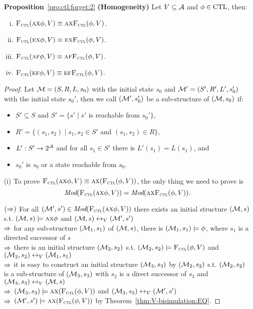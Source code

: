 \documentclass[twoside,11pt]{article}
\begin{document}
	
	\textbf{Proposition}~\ref{pro:ctl:forget:2} \textbf{(Homogeneity)}
	Let $V\subseteq\cal A$ and $\phi \in \textrm{CTL}$, then:%
	\begin{enumerate}[(i)]
		\item ${\textsc{F}_{\textsc{ctl}}}(\textsc{a}\textsc{x}\phi,V)\equiv \textsc{a}\textsc{x} {\textsc{F}_{\textsc{ctl}}}(\phi,V)$.
		\item ${\textsc{F}_{\textsc{ctl}}}(\textsc{e}\textsc{x}\phi,V)\equiv\textsc{e}\textsc{x} {\textsc{F}_{\textsc{ctl}}}(\phi,V)$.
		\item ${\textsc{F}_{\textsc{ctl}}}(\textsc{a} \textsc{f}\phi,V)\equiv \textsc{a} \textsc{f} {\textsc{F}_{\textsc{ctl}}}(\phi,V)$.
		\item ${\textsc{F}_{\textsc{ctl}}}(\textsc{e}\textsc{f}\phi,V)\equiv\textsc{e}\textsc{f} {\textsc{F}_{\textsc{ctl}}}(\phi,V)$.
	\end{enumerate}
	\begin{proof}
		Let ${\cal M}=(S, R, L,s_0)$ with the initial state $s_0$ and ${\cal M}'=(S', R', L',s_0')$ with the initial state $s_0'$, then we call $({\cal M}', s_0')$ be a sub-structure of $({\cal M},s_0)$ if:
		\begin{itemize}
			\item $S' \subseteq S$ and $S'=\{s' \mid s'$ is reachable from $s_0'\}$,
			\item $R' =\{(s_1, s_2)\mid s_1, s_2 \in S'$ and $(s_1, s_2) \in R\}$,
			\item $L': S' \rightarrow 2^{\cal A}$ and for all $s_1 \in S'$ there is $L'(s_1) = L(s_1)$, and
			\item $s_0'$ is $s_0$ or a state reachable from $s_0$.
		\end{itemize}
		
		(i) To prove ${\textsc{F}_{\textsc{ctl}}}(\textsc{a} \textsc{x} \phi, V) \equiv \textsc{a} \textsc{x}({\textsc{F}_{\textsc{ctl}}}(\phi, V))$, the only thing we need to prove is \[\textit{Mod}({\textsc{F}_{\textsc{ctl}}}(\textsc{a} \textsc{x} \phi, V)) = \textit{Mod}( \textsc{a}\textsc{x}{\textsc{F}_{\textsc{ctl}}}(\phi, V)).\]
		
		$(\Rightarrow)$ For all $({\cal M}', s') \in \textit{Mod}({\textsc{F}_{\textsc{ctl}}}(\textsc{a} \textsc{x} \phi, V))$ there exists an initial structure $({\cal M}, s)$ s.t. $({\cal M}, s)\models \textsc{a} \textsc{x} \phi$ and $({\cal M}, s) \leftrightarrow_V ({\cal M}',s')$\\
		$\Rightarrow$ for any sub-structure $({\cal M}_1, s_1)$ of $({\cal M}, s)$, there is $({\cal M}_1, s_1) \models \phi$, where $s_1$ is a directed successor of $s$ \\
		$\Rightarrow$ there is an initial structure $({\cal M}_2, s_2)$ s.t. $({\cal M}_2, s_2) \models {\textsc{F}_{\textsc{ctl}}}(\phi,V)$ and $({\cal M}_2, s_2) \leftrightarrow_V ({\cal M}_1,s_1)$\\
		$\Rightarrow$ it is easy to construct an initial structure $({\cal M}_3, s_3)$ by $({\cal M}_2, s_2)$ s.t. $({\cal M}_2, s_2)$ is a sub-structure of $({\cal M}_3, s_3)$ with $s_2$ is a direct successor of $s_3$ and $({\cal M}_3, s_3) \leftrightarrow_V ({\cal M},s)$\\
		$\Rightarrow$ $({\cal M}_3, s_3) \models \textsc{a} \textsc{x} ({\textsc{F}_{\textsc{ctl}}}(\phi,V))$ and $({\cal M}_3, s_3) \leftrightarrow_V ({\cal M}',s')$\\
		$\Rightarrow$ $({\cal M}', s') \models \textsc{a} \textsc{x} ({\textsc{F}_{\textsc{ctl}}}(\phi,V))$ by Theorem~\ref{thm:V-bisimulation:EQ}.
		

\end{proof}
\end{document}
